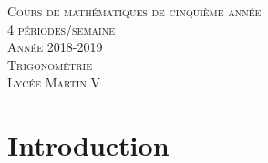 \documentclass[a4paper,fontsize=13pt]{scrreprt}
\theoremstyle{plain}
\theoremstyle{definition}
\begin{document}
	
\begin{titlepage}
	
	\newcommand{\HRule}{\rule{\linewidth}{0.4mm}} %
	
	\center %
	
	
	\vspace{4cm}
	
	\textsc{\Large Cours de mathématiques de cinquième année \\ 4 périodes/semaine \\ Année 2018-2019}\\[0.3cm]
	\vspace{9.4cm}
	\textsc{\LARGE Trigonométrie}\\[0.6cm] %
	\vspace{9.8cm}
	\textsc{\Large Lycée Martin V}\\[0.3cm] %
	

	
\end{titlepage}
	

\tableofcontents



\chapter{Introduction}
\end{document}

